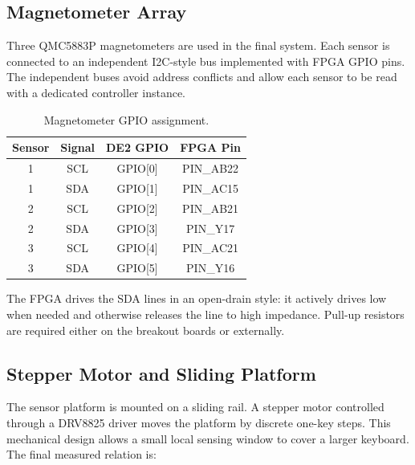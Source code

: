 
\subsection{Magnetometer Array}

Three QMC5883P magnetometers are used in the final system. Each sensor is connected to an independent I2C-style bus implemented with FPGA GPIO pins. The independent buses avoid address conflicts and allow each sensor to be read with a dedicated controller instance.

\begin{table}[H]
    \centering
    \caption{Magnetometer GPIO assignment.}
    \label{tab:magnetometer_gpio}
    \renewcommand{\arraystretch}{1.2}
    \begin{tabular}{c c c c}
        \toprule
        \textbf{Sensor} & \textbf{Signal} & \textbf{DE2 GPIO} & \textbf{FPGA Pin} \\
        \midrule
        1 & SCL & GPIO[0] & PIN\_AB22 \\
        1 & SDA & GPIO[1] & PIN\_AC15 \\
        2 & SCL & GPIO[2] & PIN\_AB21 \\
        2 & SDA & GPIO[3] & PIN\_Y17 \\
        3 & SCL & GPIO[4] & PIN\_AC21 \\
        3 & SDA & GPIO[5] & PIN\_Y16 \\
        \bottomrule
    \end{tabular}
\end{table}

The FPGA drives the SDA lines in an open-drain style: it actively drives low when needed and otherwise releases the line to high impedance. Pull-up resistors are required either on the breakout boards or externally.

\subsection{Stepper Motor and Sliding Platform}

The sensor platform is mounted on a sliding rail. A stepper motor controlled through a DRV8825 driver moves the platform by discrete one-key steps. This mechanical design allows a small local sensing window to cover a larger keyboard. The final measured relation is:

